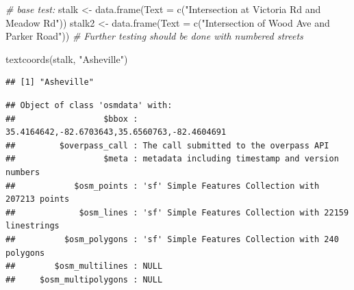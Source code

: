 \documentclass[
]{article}
\newenvironment{Shaded}{\begin{snugshade}}{\end{snugshade}}
\newcommand{\AttributeTok}[1]{\textcolor[rgb]{0.77,0.63,0.00}{#1}}
\newcommand{\CommentTok}[1]{\textcolor[rgb]{0.56,0.35,0.01}{\textit{#1}}}
\newcommand{\FunctionTok}[1]{\textcolor[rgb]{0.00,0.00,0.00}{#1}}
\newcommand{\NormalTok}[1]{#1}
\newcommand{\OtherTok}[1]{\textcolor[rgb]{0.56,0.35,0.01}{#1}}
\newcommand{\StringTok}[1]{\textcolor[rgb]{0.31,0.60,0.02}{#1}}
\begin{document}
\begin{Shaded}
\begin{Highlighting}[]
\CommentTok{\# base test:}
\NormalTok{stalk }\OtherTok{\textless{}{-}} \FunctionTok{data.frame}\NormalTok{(}\AttributeTok{Text =} \FunctionTok{c}\NormalTok{(}\StringTok{"Intersection at Victoria Rd and Meadow Rd"}\NormalTok{))}
\NormalTok{stalk2 }\OtherTok{\textless{}{-}} \FunctionTok{data.frame}\NormalTok{(}\AttributeTok{Text =} \FunctionTok{c}\NormalTok{(}\StringTok{"Intersection of Wood Ave and Parker Road"}\NormalTok{))}
\CommentTok{\# Further testing should be done with numbered streets}

\FunctionTok{textcoords}\NormalTok{(stalk, }\StringTok{"Asheville"}\NormalTok{)}
\end{Highlighting}
\end{Shaded}

\begin{verbatim}
## [1] "Asheville"
\end{verbatim}

\begin{verbatim}
## Object of class 'osmdata' with:
##                  $bbox : 35.4164642,-82.6703643,35.6560763,-82.4604691
##         $overpass_call : The call submitted to the overpass API
##                  $meta : metadata including timestamp and version numbers
##            $osm_points : 'sf' Simple Features Collection with 207213 points
##             $osm_lines : 'sf' Simple Features Collection with 22159 linestrings
##          $osm_polygons : 'sf' Simple Features Collection with 240 polygons
##        $osm_multilines : NULL
##     $osm_multipolygons : NULL
\end{verbatim}
\end{document}
